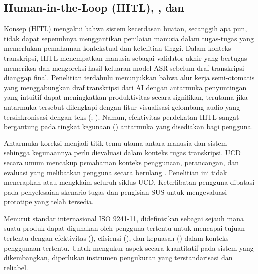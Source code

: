 \subsection{Human-in-the-Loop (HITL), , dan }
Konsep  (HITL) mengakui bahwa sistem kecerdasan buatan, secanggih apa pun, tidak dapat sepenuhnya menggantikan penilaian manusia dalam tugas-tugas yang memerlukan pemahaman kontekstual dan ketelitian tinggi. Dalam konteks transkripsi, HITL menempatkan manusia sebagai validator akhir yang bertugas memeriksa dan mengoreksi hasil keluaran model ASR sebelum draf transkripsi dianggap final. Penelitian terdahulu menunjukkan bahwa alur kerja semi-otomatis yang menggabungkan draf transkripsi dari AI dengan antarmuka penyuntingan yang intuitif dapat meningkatkan produktivitas secara signifikan, terutama jika antarmuka tersebut dilengkapi dengan fitur visualisasi gelombang audio yang tersinkronisasi dengan teks (; ). Namun, efektivitas pendekatan HITL sangat bergantung pada tingkat kegunaan () antarmuka yang disediakan bagi pengguna.

Antarmuka koreksi menjadi titik temu utama antara manusia dan sistem sehingga kegunaannya perlu dievaluasi dalam konteks tugas transkripsi. UCD secara umum mencakup pemahaman konteks penggunaan, perancangan, dan evaluasi yang melibatkan pengguna secara berulang \citep{riebel_user-centered_2023}. Penelitian ini tidak menerapkan atau mengklaim seluruh siklus UCD. Keterlibatan pengguna dibatasi pada penyelesaian skenario tugas dan pengisian SUS untuk mengevaluasi prototipe yang telah tersedia.

Menurut standar internasional ISO 9241-11,  didefinisikan sebagai sejauh mana suatu produk dapat digunakan oleh pengguna tertentu untuk mencapai tujuan tertentu dengan efektivitas (), efisiensi (), dan kepuasan () dalam konteks penggunaan tertentu. Untuk mengukur aspek  secara kuantitatif pada sistem yang dikembangkan, diperlukan instrumen pengukuran yang terstandarisasi dan reliabel.

